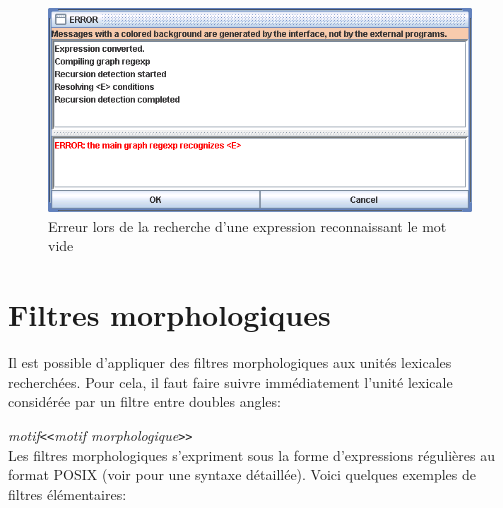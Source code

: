 \bigskip
\begin{figure}[h]
\begin{center}
\includegraphics[width=14cm]{resources/img/fig4-3.png}
\caption{Erreur lors de la recherche d’une expression reconnaissant le mot vide \label{fig-epsilon-error}}
\end{center}
\end{figure}


\section{Filtres morphologiques}
\label{section-filters}

Il est possible d’appliquer des filtres morphologiques aux unités lexicales recherchées.
Pour cela, il faut faire suivre immédiatement l’unité lexicale considérée par un filtre entre
doubles angles:


\bigskip
\noindent
\textit{motif}\verb$<<$\textit{motif morphologique}\verb$>>$ \\


\bigskip{}
\noindent Les filtres morphologiques s’expriment sous la forme d’expressions régulières au format
POSIX (voir \cite{TRE} pour une syntaxe détaillée). Voici quelques exemples de filtres élémentaires:




